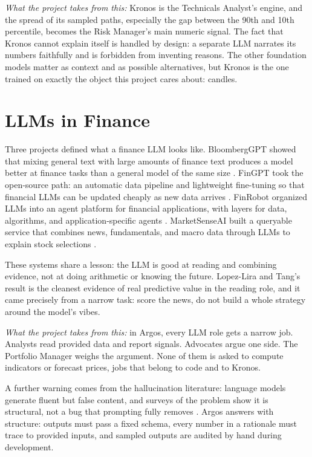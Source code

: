 \documentclass[conference]{IEEEtran}
\newcommand{\sys}{Argos}
\begin{document}
\emph{What the project takes from this:} Kronos is the Technicals Analyst's engine, and the spread of its sampled paths, especially the gap between the 90th and 10th percentile, becomes the Risk Manager's main numeric signal. The fact that Kronos cannot explain itself is handled by design: a separate LLM narrates its numbers faithfully and is forbidden from inventing reasons. The other foundation models matter as context and as possible alternatives, but Kronos is the one trained on exactly the object this project cares about: candles.

\section{LLMs in Finance}
\label{sec:llmfinance}

Three projects defined what a finance LLM looks like. BloombergGPT showed that mixing general text with large amounts of finance text produces a model better at finance tasks than a general model of the same size \cite{wu2023bloomberggpt}. FinGPT took the open-source path: an automatic data pipeline and lightweight fine-tuning so that financial LLMs can be updated cheaply as new data arrives \cite{yang2023fingpt}. FinRobot organized LLMs into an agent platform for financial applications, with layers for data, algorithms, and application-specific agents \cite{yang2024finrobot}. MarketSenseAI built a queryable service that combines news, fundamentals, and macro data through LLMs to explain stock selections \cite{fatouros2024marketsenseai}.

These systems share a lesson: the LLM is good at reading and combining evidence, not at doing arithmetic or knowing the future. Lopez-Lira and Tang's result \cite{lopezlira2023chatgpt} is the cleanest evidence of real predictive value in the reading role, and it came precisely from a narrow task: score the news, do not build a whole strategy around the model's vibes.

\emph{What the project takes from this:} in \sys{}, every LLM role gets a narrow job. Analysts read provided data and report signals. Advocates argue one side. The Portfolio Manager weighs the argument. None of them is asked to compute indicators or forecast prices, jobs that belong to code and to Kronos.

A further warning comes from the hallucination literature: language models generate fluent but false content, and surveys of the problem show it is structural, not a bug that prompting fully removes \cite{ji2023hallucination}. \sys{} answers with structure: outputs must pass a fixed schema, every number in a rationale must trace to provided inputs, and sampled outputs are audited by hand during development.
\end{document}

